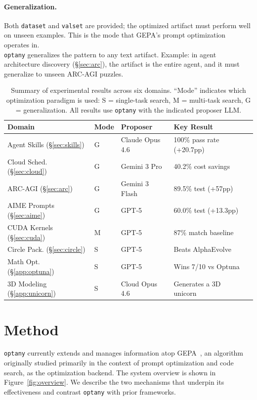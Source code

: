 \documentclass[sigconf,anonymous,review]{acmart}
\newcommand{\oa}{\texttt{optany}}
\begin{document}
\paragraph{Generalization.} Both \texttt{dataset} and \texttt{valset} are provided; the optimized artifact must perform well on unseen examples. This is the mode that GEPA's prompt optimization~\cite{agrawal2026gepa} operates in. \\ \oa{} generalizes the pattern to any text artifact. Example: in agent architecture discovery (\S\ref{sec:arc}), the artifact is the entire agent, and it must generalize to unseen ARC-AGI puzzles.

\begin{table}[t]
\caption{Summary of experimental results across six domains. ``Mode'' indicates which optimization paradigm is used: S = single-task search, M = multi-task search, G = generalization. All results use \oa{} with the indicated proposer LLM.}
\label{tab:summary}
\small
\begin{tabular}{@{}llllr@{}}
\toprule
\textbf{Domain} & \textbf{Mode} & \textbf{Proposer} & \textbf{Key Result} \\
\midrule
Agent Skills (\S\ref{sec:skills}) & G & Claude Opus 4.6 & 100\% pass rate (+20.7pp) \\
Cloud Sched. (\S\ref{sec:cloud}) & G & Gemini 3 Pro & 40.2\% cost savings \\
ARC-AGI (\S\ref{sec:arc}) & G & Gemini 3 Flash & 89.5\% test (+57pp) \\
AIME Prompts (\S\ref{sec:aime}) & G & GPT-5 & 60.0\% test (+13.3pp) \\
CUDA Kernels (\S\ref{sec:cuda}) & M & GPT-5 & 87\% match baseline \\
Circle Pack. (\S\ref{sec:circle}) & S & GPT-5 & Beats AlphaEvolve \\
Math Opt. (\S\ref{app:optuna}) & S & GPT-5 & Wins 7/10 vs Optuna \\
3D Modeling (\S\ref{app:unicorn}) & S & Cloud Opus 4.6 & Generates a 3D unicorn \\
\bottomrule
\end{tabular}
\end{table}


\section{Method}\label{sec:method}

\oa{} currently extends and manages information atop GEPA~\cite{agrawal2026gepa}, an algorithm originally studied primarily in the context of prompt optimization and code search, as the optimization backend.
The system overview is shown in Figure~\ref{fig:overview}. We describe the two mechanisms that underpin its effectiveness and contrast \oa{} with prior frameworks.
\end{document}
